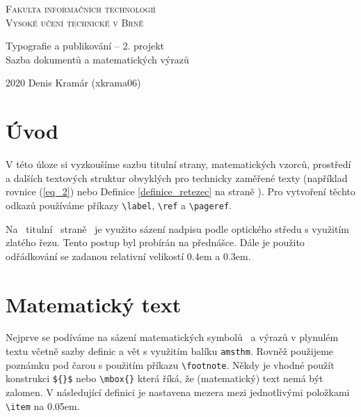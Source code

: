 \documentclass[a4paper, 11pt, twocolumn]{article}
\theoremstyle{definition}
\begin{document}
    \begin{titlepage}
        \begin{center}
            {\Huge\textsc{Fakulta informačních technologií \\[0.4em]
            Vysoké učení technické v Brně}}\\
    
    
            {\LARGE Typografie a publikování – 2. projekt \\[0.3em]
            Sazba dokumentů a matematických výrazů}\\
            
            
            {\Large
            2020
            \hfill
            Denis Kramár (xkrama06)}
        \end{center}
        
    \end{titlepage}

    \section*{Úvod}
    V této úloze si vyzkoušíme sazbu titulní strany, matematic\-kých vzorců, prostředí a dalších textových struktur obvyklých pro technicky zaměřené texty (například rovnice (\ref{eq_2}) nebo Definice \ref{definice_retezec} na straně \pageref{definice_retezec}). Pro vytvoření těchto odkazů používáme příkazy \verb!\label!, \verb!\ref! a \verb!\pageref!.
    
    Na ~titulní ~straně ~je využito sázení nadpisu podle op\-tického středu s využitím zlatého řezu. Tento postup byl
    probírán na přednášce. Dále je použito odřádkování se
    zadanou relativní velikostí 0.4em a 0.3em.
    
    \section{Matematický text}
    Nejprve se podíváme na sázení matematických symbolů ~a výrazů v plynulém textu včetně sazby definic a vět s využitím balíku \texttt{amsthm}. Rovněž použijeme poznámku pod čarou s použitím příkazu \verb!\footnote!. Někdy je vhodné použít konstrukci \verb!${}$! nebo \verb!\mbox{}! která říká, že (matematický) text nemá být zalomen. V následující definici je nastavena mezera mezi jednotlivými položkami \verb!\item! na 0.05em.
    
\end{document}
